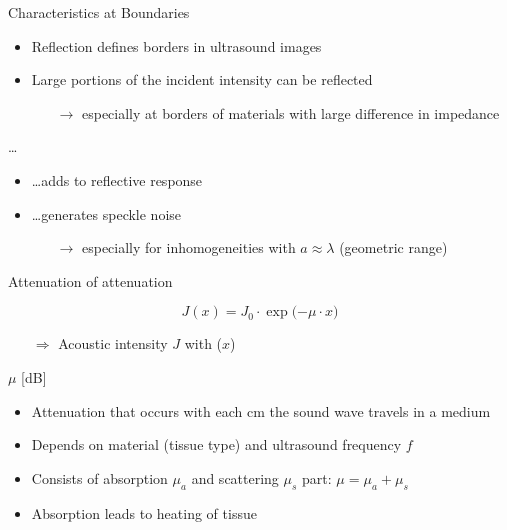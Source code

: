 \begin{frame}[c]{Characteristics at Boundaries \cont}
    \begin{itemize}
        \item Reflection defines borders in ultrasound images
        \item Large portions of the incident intensity can be reflected\\
              \begin{itemize}
                  \item[$\rightarrow$] especially at borders of materials with large difference in impedance
              \end{itemize}
    \end{itemize}
    \vspace{.5cm}
     \dots
    \begin{itemize}
        \item \dots adds to reflective response
        \item \dots generates speckle noise
              \begin{itemize}
                  \item[$\rightarrow$] especially for inhomogeneities with $a \approx \lambda$ (geometric range)
              \end{itemize}
    \end{itemize}
    \vspace{.5cm}

\end{frame}


\begin{frame}{Attenuation}
     of attenuation

    \begin{equation}
        J(x) = J_0\cdot\exp{(-\mu \cdot x})
    \end{equation}

    \begin{itemize}
        \item[$\Rightarrow$] Acoustic intensity $J$  with  ($x$)
    \end{itemize}

    \vspace{1cm}
     $\mu$ [dB]
    \begin{itemize}
        \item Attenuation that occurs with each cm the sound wave travels in a medium
        \item Depends on material (tissue type) and ultrasound frequency $f$
        \item Consists of absorption $\mu_a$ and scattering $\mu_s$ part: $\mu = \mu_a + \mu_s$
        \item Absorption leads to heating of tissue
    \end{itemize}
\end{frame}



